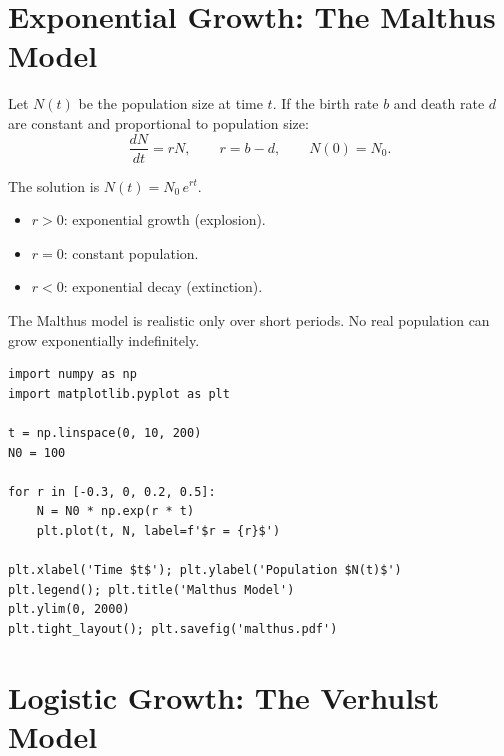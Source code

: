 \section{Exponential Growth: The Malthus Model}
\label{sec:malthus}

\begin{definition}
Let $N(t)$ be the population size at time $t$.  If the birth rate $b$
and death rate $d$ are constant and proportional to population size:
\[
  \frac{dN}{dt} = rN, \qquad r = b - d, \qquad N(0) = N_0.
\]
\end{definition}

\begin{theorem}
The solution is $N(t) = N_0\,e^{rt}$.
\begin{itemize}
  \item $r > 0$: exponential growth (explosion).
  \item $r = 0$: constant population.
  \item $r < 0$: exponential decay (extinction).
\end{itemize}
\end{theorem}

\begin{remark}
The Malthus model is realistic only over short periods.  No real
population can grow exponentially indefinitely.
\end{remark}

\begin{codeblock}[title=\textbf{Malthus model in Python}]
\begin{verbatim}
import numpy as np
import matplotlib.pyplot as plt

t = np.linspace(0, 10, 200)
N0 = 100

for r in [-0.3, 0, 0.2, 0.5]:
    N = N0 * np.exp(r * t)
    plt.plot(t, N, label=f'$r = {r}$')

plt.xlabel('Time $t$'); plt.ylabel('Population $N(t)$')
plt.legend(); plt.title('Malthus Model')
plt.ylim(0, 2000)
plt.tight_layout(); plt.savefig('malthus.pdf')
\end{verbatim}
\end{codeblock}

\section{Logistic Growth: The Verhulst Model}
\label{sec:verhulst}

